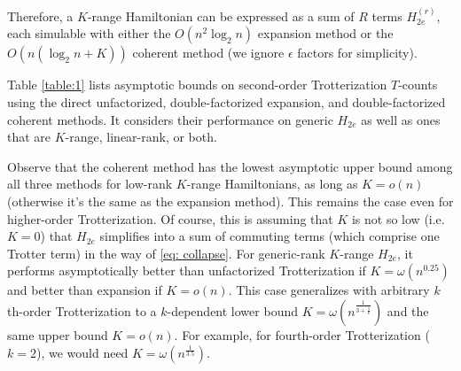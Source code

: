 Therefore, a $K$-range Hamiltonian can be expressed as a sum of $R$ terms $H_{2e}^{(r)}$, each simulable with either the $O(n^2\log_2{n})$ expansion method or the $O(n(\log_2{n} + K))$ coherent method (we ignore $\epsilon$ factors for simplicity).

Table \ref{table:1} lists asymptotic bounds on second-order Trotterization $T$-counts using the direct unfactorized, double-factorized expansion, and double-factorized coherent methods. It considers their performance on generic $H_{2e}$ as well as ones that are $K$-range, linear-rank, or both.

Observe that the coherent method has the lowest asymptotic upper bound among all three methods for low-rank $K$-range Hamiltonians, as long as $K = o(n)$ (otherwise it's the same as the expansion method). This remains the case even for higher-order Trotterization. Of course, this is assuming that $K$ is not so low (i.e. $K = 0$) that $H_{2e}$ simplifies into a sum of commuting terms (which comprise one Trotter term) in the way of \eqref{eq: collapse}.
For generic-rank $K$-range $H_{2e}$, it performs asymptotically better than unfactorized Trotterization if $K = \omega(n^{0.25})$ and better than expansion if $K = o(n)$. This case generalizes with arbitrary $k$th-order Trotterization to a $k$-dependent lower bound $K = \omega(n^{\frac{1}{3 + \frac{1}{k}}})$ and the same upper bound $K = o(n)$. For example, for fourth-order Trotterization ($k = 2$), we would need $K = \omega(n^{\frac{1}{3.5}})$.

